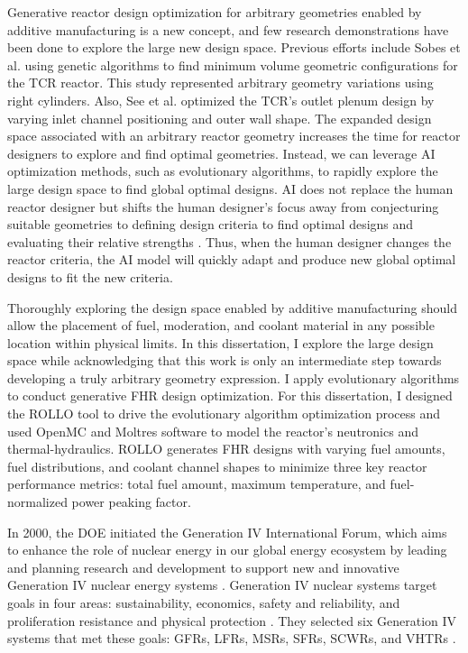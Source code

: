 Generative reactor design optimization for arbitrary geometries enabled by additive 
manufacturing is a new concept, and few research demonstrations have been done to 
explore the large new design space. 
Previous efforts include Sobes et al. \cite{sobes_artificial_2020} using genetic 
algorithms to find minimum volume geometric configurations for the TCR reactor. 
This study represented arbitrary geometry variations using right cylinders. 
Also, See et al. \cite{see_design_2022} optimized the TCR's outlet plenum design 
by varying inlet channel positioning and outer wall shape.  
The expanded design space associated with an arbitrary reactor geometry increases 
the time for reactor designers to explore and find optimal geometries. 
Instead, we can leverage \gls{AI} optimization methods, such as evolutionary algorithms, 
to rapidly explore the large design space to find global optimal designs. 
\gls{AI} does not replace the human reactor designer but shifts the human designer's 
focus away from conjecturing suitable geometries to defining design criteria to 
find optimal designs and evaluating their relative strengths \cite{sobes_artificial_2020}. 
Thus, when the human designer changes the reactor criteria, the AI model will quickly 
adapt and produce new global optimal designs to fit the new criteria.

Thoroughly exploring the design space enabled by additive manufacturing should allow 
the placement of fuel, moderation, and coolant material in any possible location 
within physical limits. 
In this dissertation, I explore the large design space while acknowledging that 
this work is only an intermediate step towards developing a truly arbitrary 
geometry expression. 
I apply evolutionary algorithms to conduct generative \gls{FHR} design optimization. 
For this dissertation, I designed the \gls{ROLLO} tool \cite{chee_rollo_2021} to 
drive the evolutionary algorithm optimization process and used OpenMC 
\cite{romano_openmc:_2015} and Moltres \cite{lindsay_introduction_2018} software to 
model the reactor's neutronics and thermal-hydraulics. 
\gls{ROLLO} generates \gls{FHR} designs with varying fuel amounts, fuel 
distributions, and coolant channel shapes to minimize three key reactor performance 
metrics: total fuel amount, maximum temperature, and fuel-normalized power peaking 
factor. 

In 2000, the \gls{DOE} initiated the Generation IV International Forum, which aims 
to enhance the role of nuclear energy in our global energy ecosystem by 
leading and planning research and development to support new and innovative 
Generation IV nuclear energy systems \cite{gif_technology_2002}.
Generation IV nuclear systems target goals in four areas: sustainability, 
economics, safety and reliability, and proliferation resistance and physical 
protection \cite{gif_technology_2002}. 
They selected six Generation IV systems that met these goals: \glspl{GFR}, 
\glspl{LFR}, \glspl{MSR}, \glspl{SFR}, \glspl{SCWR}, and \glspl{VHTR} 
\cite{gif_technology_2002}. 


